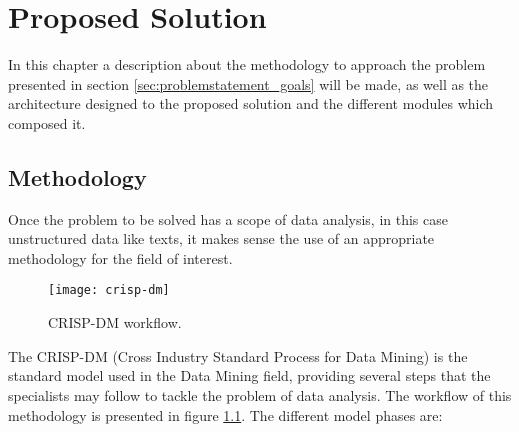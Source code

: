 \chapter{Proposed Solution}\label{chap:problemsolution}

In this chapter a description about the methodology to approach the problem presented in section \ref{sec:problemstatement_goals} will be made, as well as the architecture designed to the proposed solution and the different modules which composed it.

\section{Methodology}

Once the problem to be solved has a scope of data analysis, in this case unstructured data like texts, it makes sense the use of an appropriate methodology for the field of interest.

\begin{figure}
  \centering
    \texttt{[image: crisp-dm]}
    \caption{CRISP-DM workflow.}
    \label{fig:crisp-dm}
\end{figure}

The CRISP-DM (Cross Industry Standard Process for Data Mining) is the standard model used in the Data Mining field, providing several steps that the specialists may follow to tackle the problem of data analysis. The workflow of this methodology is presented in figure \ref{fig:crisp-dm}. The different model phases are:

